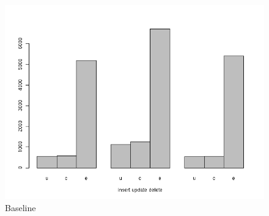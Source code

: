 \begin{figure}[h] \centering
\includegraphics[width=.8\textwidth]{./figure/result/Solution0-barplot.png}
		\caption{Baseline}\label{fr:Solution0-barplot}
	\end{figure}
	
